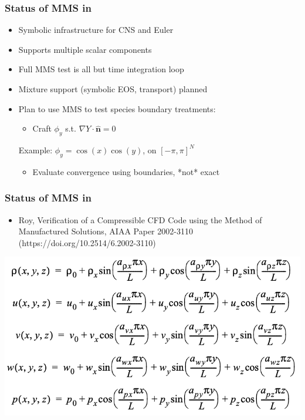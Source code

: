 \begin{frame}\frametitle{Status of MMS in \mirgecom{}}
\begin{itemize}
\item Symbolic infrastructure for CNS and Euler
\item Supports multiple scalar components
\item Full MMS test is all but time integration loop
\item Mixture support (symbolic EOS, transport) planned
\item Plan to use MMS to test species boundary treatments:
      \begin{itemize}
      \item Craft $\phi_y$ s.t. $\nabla{Y} \cdot \hat{\mathbf{n}} = 0$
      \end{itemize}
      Example: $\phi_y = \cos(x)\cos(y)$, on $\left[-\pi, \pi\right]^N$
      \begin{itemize}
      \item Evaluate convergence using \mirgecom{} boundaries, *not* exact
      \end{itemize}
\end{itemize}
\end{frame}

\begin{frame}\frametitle{Status of MMS in \mirgecom{}}
\begin{itemize}
\item Roy, Verification of a Compressible CFD Code using the Method of Manufactured Solutions, AIAA Paper 2002-3110 (https://doi.org/10.2514/6.2002-3110)
\end{itemize}
\begin{center}
\includegraphics[width=.75\textwidth]{figures/RoySoln.png}
\end{center}
\end{frame}

